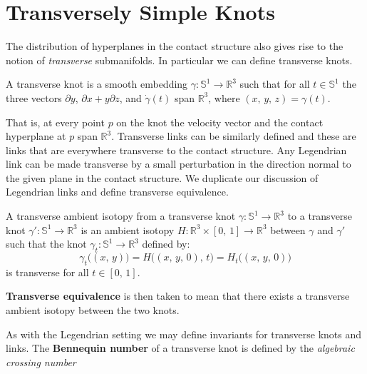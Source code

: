 \section{Transversely Simple Knots}
    The distribution of hyperplanes in the contact structure also gives rise to
    the notion of \textit{transverse} submanifolds. In particular we can define
    transverse knots.
    \begin{definition}
        A transverse knot is a smooth embedding
        $\gamma:\mathbb{S}^{1}\rightarrow\mathbb{R}^{3}$ such that for all
        $t\in\mathbb{S}^{1}$ the three vectors
        $\partial{y}$, $\partial{x}+y\partial{z}$, and
        $\dot{\gamma}(t)$ span $\mathbb{R}^{3}$, where $(x,\,y,\,z)=\gamma(t)$.
    \end{definition}
    That is, at every point $p$ on the knot the velocity vector and the contact
    hyperplane at $p$ span $\mathbb{R}^{3}$. Transverse links can be similarly
    defined and these are links that are everywhere transverse to the contact
    structure. Any Legendrian link can be made transverse by a small
    perturbation in the direction normal to the given plane in the contact
    structure. We duplicate our discussion of Legendrian links and define
    transverse equivalence.
    \begin{definition}
        A transverse ambient isotopy from a transverse knot
        $\gamma:\mathbb{S}^{1}\rightarrow\mathbb{R}^{3}$ to a transverse knot
        $\gamma':\mathbb{S}^{1}\rightarrow\mathbb{R}^{3}$ is an ambient
        isotopy $H:\mathbb{R}^{3}\times[0,\,1]\rightarrow\mathbb{R}^{3}$
        between $\gamma$ and $\gamma'$ such that the knot
        $\gamma_{t}:\mathbb{S}^{1}\rightarrow\mathbb{R}^{3}$ defined by:
        \begin{equation}
            \gamma_{t}\big((x,\,y)\big)
            =H\big((x,\,y,\,0),\,t\big)
            =H_{t}\big((x,\,y,\,0)\big)
        \end{equation}
        is transverse for all $t\in[0,\,1]$.
    \end{definition}
    \textbf{Transverse equivalence} is then taken to mean that there exists
    a transverse ambient isotopy between the two knots.
    \par\hfill\par
    As with the Legendrian setting we may define invariants for transverse
    knots and links. The \textbf{Bennequin number} of a
    transverse knot is defined by the \textit{algebraic crossing number}
